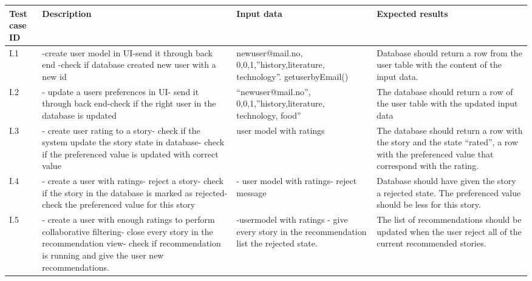 \begin{table}[!h]
	\centering
		\begin{tabular}{ | p{1cm} | p{6.5cm} | p{3cm} | p{6.5cm} |}
			\hline
			\textbf{Test case ID} & \textbf{Description} & \textbf{Input data} & \textbf{Expected results} \\ \hline
			
			I.1 & -create user model in UI\newline -send it through back end \newline -check if database created new user with a new id & newuser@mail.no, 0,0,1,”history,literature, technology”. getuserbyEmail() & Database should return a row from the user table with the content of the input data. \\ \hline
			
			I.2 & - update a users preferences in UI\newline - send it through back end\newline -check if the right user in the database is updated & “newuser@mail.no”, 0,0,1,”history,literature, technology, food” & The database should return a row of the user table with the updated input data \\ \hline
			
			I.3 & - create user rating to a story\newline- check if the system update the story state in database\newline - check if the preferenced value is updated with correct value & user model with ratings & The database should return a row with the story and the state “rated”, a row with the preferenced value that correspond with the rating.  \\ \hline
			
			I.4 & - create a user with ratings\newline - reject a story\newline - check if the story in the database is marked as rejected\newline - check the preferenced value for this story & - user model with ratings\newline - reject message & Database should have given the story a rejected state. The preferenced value should be less for this story. \\ \hline
			
			I.5 & - create a user with enough ratings to perform collaborative filtering\newline - close every story in the recommendation view\newline - check if recommendation is running and give the user new recommendations.  & -usermodel with ratings\newline
			- give every story in the recommendation list the rejected state. & The list of recommendations should be updated when the user reject all of the current recommended stories. \\ \hline
			

\end{tabular}
\end{table}
